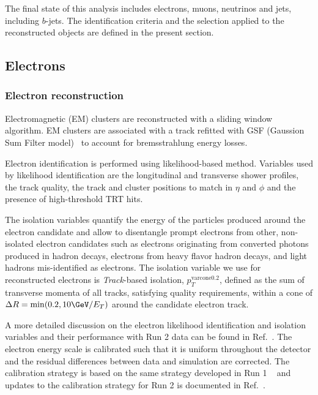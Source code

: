 
The final state of this analysis includes electrons, muons, neutrinos and jets, including $b$-jets. 
The identification criteria and the selection applied to the reconstructed objects are defined in the
present section.

\subsection{Electrons}
\label{sec:el_def}

\subsubsection{Electron reconstruction}
\label{sec:el_reco}
Electromagnetic (EM) clusters are reconstructed with a sliding window algorithm. EM clusters are associated with 
a track refitted with GSF (Gaussion Sum Filter model)~\cite{ATLAS-CONF-2012-047} to account for bremsstrahlung energy losses. 
 
Electron identification is performed using likelihood-based method. Variables used by likelihood identification are the longitudinal 
and transverse shower profiles, the track quality, the track and cluster positions to match in $\eta$ and $\phi$ and the presence 
of high-threshold TRT hits. 

The isolation variables quantify the energy of the particles produced 
around the electron candidate and allow to disentangle prompt electrons 
from other, non-isolated electron candidates such as electrons originating 
from converted photons produced in hadron decays, electrons from heavy flavor hadron decays, 
and light hadrons mis-identified as electrons. The isolation variable we use for reconstructed electrons 
is \textit{Track}-based isolation, ${p_{T}^{\textrm{varcone0.2}}}$, defined as the sum of transverse momenta
of all tracks, satisfying quality requirements, within a cone of $\Delta R = \mathrm{min}(0.2,10 \GeV/E_{T})$
around the candidate electron track.

A more detailed discussion on the electron likelihood identification and isolation variables 
and their performance with Run 2 data can be found in Ref.~\cite{ATLAS-CONF-2016-024}. 
The electron energy scale is calibrated such that it is uniform throughout the detector and the residual differences
between data and simulation are corrected. The calibration strategy is based on the same strategy developed 
in Run 1 ~\cite{ATLAS-EGAMMACALIB-RUN1} and updates to the calibration strategy for Run 2 is 
documented in Ref.~\cite{ATL-PHYS-PUB-2016-015}.

